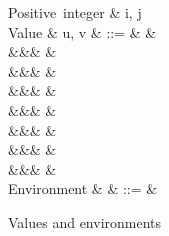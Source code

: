 \begin{figure}[H]
\begin{syntaxfig}
\mbox{Positive integer}
&
i, j
\\[2mm]
\mbox{Value}
&
u, v
&
::=
&
\exTrue \mid \exFalse
&
\\
&&&
&
\\
&&&
\exNil
&
\\
&&&
&
\\
&&&
&
\\
&&&
&
\\
&&&
&
\\
&&&
&
\\[2mm]
\mbox{Environment}
&
\rho
&
::=
&
\end{syntaxfig}
\caption{Values and environments}
\end{figure}

